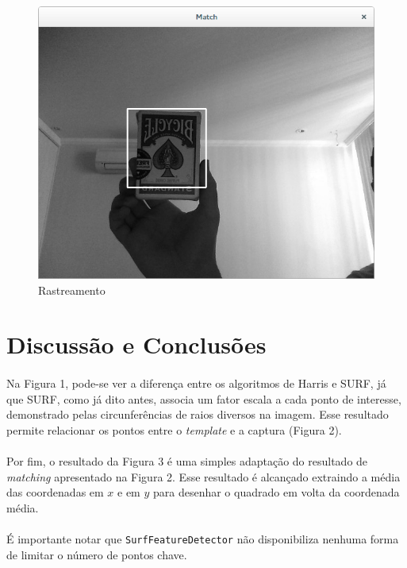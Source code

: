 \documentclass[conference, harvard, brazil, english]{sbatex}
\begin{document}
			\paragraph{}
			\begin{figure}[h]
				\includegraphics[scale=0.30]{track}
				\caption{Rastreamento}
			\end{figure}
			
		\section{Discussão e Conclusões}
			\paragraph{}
			Na Figura 1, pode-se ver a diferença entre os algoritmos de Harris e SURF, já que SURF, como já dito antes, associa um fator escala a cada ponto de interesse, demonstrado pelas circunferências de raios diversos na imagem. Esse resultado permite relacionar os pontos entre o \textit{template} e a captura (Figura 2).
			\paragraph{}
			Por fim, o resultado da Figura 3 é uma simples adaptação do resultado de \textit{matching} apresentado na Figura 2. Esse resultado é alcançado extraindo a média das coordenadas em $x$ e em $y$ para desenhar o quadrado em volta da coordenada média.
			\paragraph{}
			É importante notar que \verb|SurfFeatureDetector| não disponibiliza nenhuma forma de limitar o número de pontos chave.
			
\end{document}
